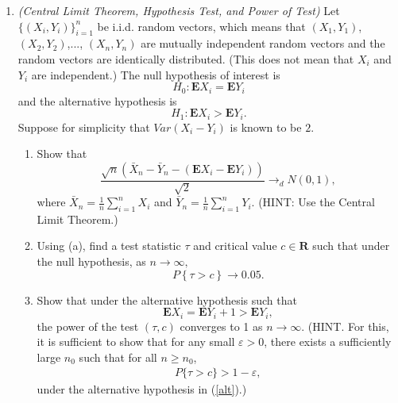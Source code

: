 \documentclass[11pt]{article}
\begin{document}
\begin{enumerate}
	\item \textit{(Central Limit Theorem, Hypothesis Test, and Power of Test)} Let $\{(X_{i},Y_{i})\}_{i=1}^{n}$ be i.i.d. random vectors, which means that $(X_{1},Y_{1})$, $(X_{2},Y_{2})$,..., $(X_{n},Y_{n})$ are mutually independent random vectors and the random vectors are identically distributed. (This does not mean that $X_{i}$ and $Y_{i}$ are independent.) The null hypothesis of interest is%
	\begin{equation*}
		H_{0}:\mathbf{E}X_{i}=\mathbf{E}Y_{i}
	\end{equation*}%
	and the alternative hypothesis is%
	\begin{equation*}
		H_{1}:\mathbf{E}X_{i} > \mathbf{E}Y_{i}.
	\end{equation*}%
	Suppose for simplicity that $Var(X_{i} - Y_{i})$ is known to be $2$.
	\medskip
	\begin{enumerate}
	\item Show that
	\begin{equation*}
		\frac{\sqrt{n}(\bar{X}_{n}-\bar{Y}_{n} - (\mathbf{E}X_{i} - \mathbf{E}Y_{i}))}{\sqrt{2}}\rightarrow _{d}N(0,1),
	\end{equation*}
	where $\bar{X}_{n}=\frac{1}{n}\sum_{i=1}^{n}X_{i}$ and $\bar{Y}_{n}=\frac{1}{n}\sum_{i=1}^{n}Y_{i}$.
	(HINT: Use the Central Limit Theorem.)
	\medskip
	\item Using (a), find a test statistic $\tau$ and critical value $c\in \mathbf{R}$ such that
	under the null hypothesis, as $n\rightarrow \infty,$
	\begin{equation*}
		P\left\{ \tau >c\right\} \rightarrow 0.05.
	\end{equation*}
	\item  Show that under the alternative hypothesis such that
	\begin{equation}
	\label{alt}
		\mathbf{E}X_{i}=\mathbf{E}Y_{i}+1>\mathbf{E}Y_{i},
	\end{equation}
	the power of the test $(\tau, c)$ converges to 1 as $n\rightarrow \infty$. (HINT. For this, it is sufficient to show that for any small $\varepsilon>0$, there exists a sufficiently large $n_0$ such that for all $n \ge n_0$,
	\begin{eqnarray*}
		P\{\tau > c\} > 1- \varepsilon,
	\end{eqnarray*}
under the alternative hypothesis in (\ref{alt}).)
\end{enumerate}

\end{enumerate}
\end{document}
